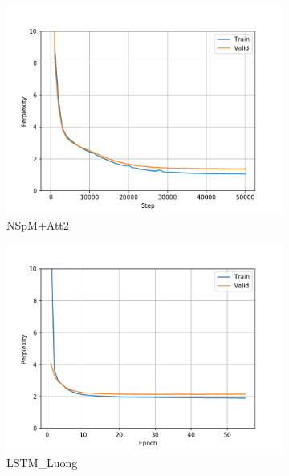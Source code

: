 \begin{figure}[H]
\begin{subfigure}{0.45\textwidth}
\includegraphics[width=\textwidth]{../results/dbnqa1/run1/neural_sparql_machine_luong_attention/ppls.png} 
\caption{NSpM+Att2}
\label{fig:dbnqa nsm-luo ppl}
\end{subfigure}
\hfill
\begin{subfigure}{0.45\textwidth}
\includegraphics[width=\textwidth]{../results/dbnqa1/run1/lstm_luong_wmt_en_de/ppls.png}
\caption{LSTM\_Luong}
\label{fig:dbnqa lstm ppl}
\end{subfigure}
\hfill
\begin{subfigure}{0.45\textwidth}

\end{subfigure}
\end{figure}
